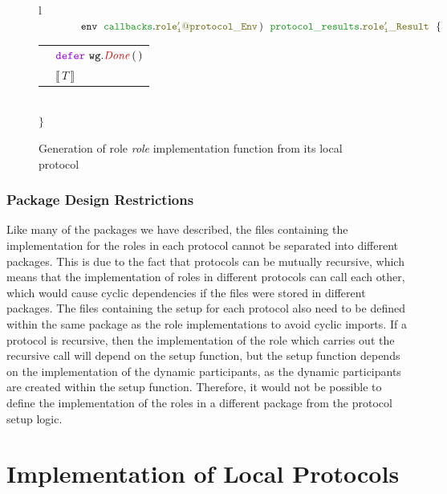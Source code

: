\documentclass[12pt,twoside]{report}
\begin{document}
\begin{figure}[!h]
\begin{center}
\begin{tabular}{l}
            $\qquad \qquad \envparam\;\ \envtype{role'_i}{protocol}\,)\ \ \resulttype{role'_i}{protocol}\ \ \{$\\[6pt]
            
            \begin{tabular}{ll}
                \indent & $\godefer\ \methodcall{wg}{Done}\,(\,)$\\[3.5pt]
                \indent & $\llbracket \, T \, \rrbracket$
            \end{tabular}\\[6pt]

            $\}$\\

        \end{tabular}
    \end{center}
    \caption{Generation of role \textit{role} implementation function from its local protocol}
    \label{role-func-sig-gen}
\end{figure}

\subsection{Package Design Restrictions}

Like many of the packages we have described, the files containing the implementation for the roles in each protocol cannot be separated into different packages. This is due to the fact that protocols can be mutually recursive, which means that the implementation of roles in different protocols can call each other, which would cause cyclic dependencies if the files were stored in different packages. The files containing the setup for each protocol also need to be defined within the same package as the role implementations to avoid cyclic imports. If a protocol is recursive, then the implementation of the role which carries out the recursive call will depend on the setup function, but the setup function depends on the implementation of the dynamic participants, as the dynamic participants are created within the setup function. Therefore, it would not be possible to define the implementation of the roles in a different package from the protocol setup logic.\\


\chapter{Implementation of Local Protocols}\label{local-protocol-codegen}
\end{document}
